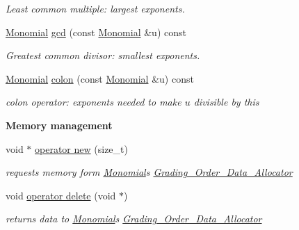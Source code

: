 \begin{Indent}
\begin{DoxyCompactItemize}
\begin{DoxyCompactList}\small\item\em Least common multiple\+: largest exponents. \end{DoxyCompactList}\item 
\mbox{\label{class_monomial_a3595c980636363b0e30b4777d76e49a6}} 
\hyperlink{class_monomial}{Monomial} \hyperlink{class_monomial_a3595c980636363b0e30b4777d76e49a6}{gcd} (const \hyperlink{class_monomial}{Monomial} \&u) const
\begin{DoxyCompactList}\small\item\em Greatest common divisor\+: smallest exponents. \end{DoxyCompactList}\item 
\mbox{\label{class_monomial_ae9e3375ea8144c587957d34979709310}} 
\hyperlink{class_monomial}{Monomial} \hyperlink{class_monomial_ae9e3375ea8144c587957d34979709310}{colon} (const \hyperlink{class_monomial}{Monomial} \&u) const
\begin{DoxyCompactList}\small\item\em colon operator\+: exponents needed to make $u$ divisible by {\ttfamily this} \end{DoxyCompactList}\end{DoxyCompactItemize}
\end{Indent}
\begin{Indent}\textbf{ Memory management}\par
\begin{DoxyCompactItemize}
\item 
\mbox{\label{class_monomial_ae048964acf913ab33ee173ae2a558666}} 
void $\ast$ \hyperlink{class_monomial_ae048964acf913ab33ee173ae2a558666}{operator new} (size\+\_\+t)
\begin{DoxyCompactList}\small\item\em requests memory form \hyperlink{class_monomial}{Monomial}\textquotesingle{}s \hyperlink{class_grading___order___data___allocator}{Grading\+\_\+\+Order\+\_\+\+Data\+\_\+\+Allocator} \end{DoxyCompactList}\item 
\mbox{\label{class_monomial_a86e0a5b7480a4f802e3b01b07a4d8920}} 
void \hyperlink{class_monomial_a86e0a5b7480a4f802e3b01b07a4d8920}{operator delete} (void $\ast$)
\begin{DoxyCompactList}\small\item\em returns data to \hyperlink{class_monomial}{Monomial}\textquotesingle{}s \hyperlink{class_grading___order___data___allocator}{Grading\+\_\+\+Order\+\_\+\+Data\+\_\+\+Allocator} \end{DoxyCompactList}\end{DoxyCompactItemize}
\end{Indent}
